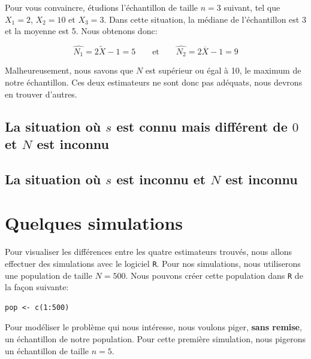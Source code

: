 \documentclass[10pt]{article}
\begin{document}
Pour vous convaincre, étudions l'échantillon de taille \(n=3\) suivant,
tel que \(X_1=2\), \(X_2=10\) et \(X_3=3\). Dans cette situation, la
médiane de l'échantillon est 3 et la moyenne est 5. Nous obtenons donc:

\[\widehat{N_1}=2\widetilde{X}-1=5 \qquad \text{et} \qquad \widehat{N_2}=2\overline{X}-1=9 \]

Malheureusement, nous savons que \(N\) est supérieur ou égal à 10, le
maximum de notre échantillon. Ces deux estimateurs ne sont donc pas
adéquats, nous devrons en trouver d'autres.

\hypertarget{la-situation-ou-s-est-connu-mais-different-de-0-et-n-est-inconnu}{%
\subsection{\texorpdfstring{La situation où \(s\) est \textbf{connu}
mais différent de \(0\) et \(N\) est
\textbf{inconnu}}{La situation où s est connu mais différent de 0 et N est inconnu}}\label{la-situation-ou-s-est-connu-mais-different-de-0-et-n-est-inconnu}}

\hypertarget{la-situation-ou-s-est-inconnu-et-n-est-inconnu}{%
\subsection{\texorpdfstring{La situation où \(s\) est \textbf{inconnu}
et \(N\) est
\textbf{inconnu}}{La situation où s est inconnu et N est inconnu}}\label{la-situation-ou-s-est-inconnu-et-n-est-inconnu}}

\hypertarget{quelques-simulations}{%
\section{\texorpdfstring{Quelques simulations
\label{simul}}{Quelques simulations }}\label{quelques-simulations}}

Pour visualiser les différences entre les quatre estimateurs trouvés,
nous allons effectuer des simulations avec le logiciel \texttt{R}. Pour
nos simulations, nous utiliserons une population de taille \(N=500\).
Nous pouvons créer cette population dans \texttt{R} de la façon
suivante:

\begin{verbatim}
pop <- c(1:500)
\end{verbatim}

Pour modéliser le problème qui nous intéresse, nous voulons piger,
\textbf{sans remise}, un échantillon de notre population. Pour cette
première simulation, nous pigerons un échantillon de taille \(n=5\).
\end{document}
